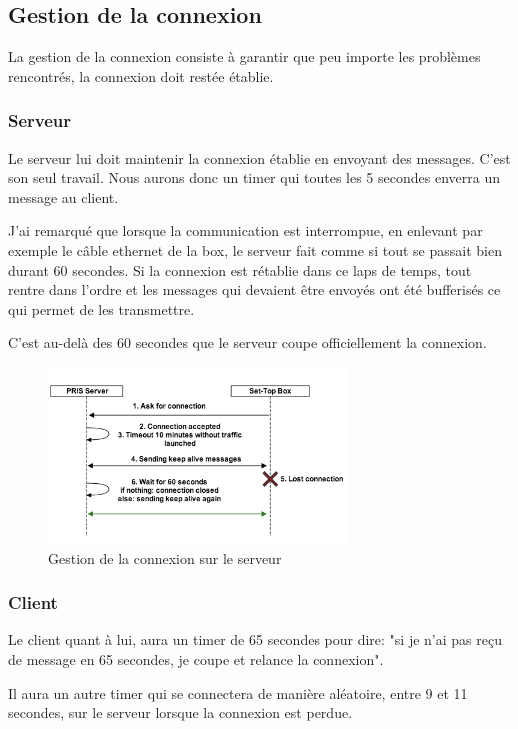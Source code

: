 \subsection{Gestion de la connexion}
La gestion de la connexion consiste à garantir que peu importe les problèmes rencontrés, la connexion doit restée établie.

\medskip

\subsubsection{Serveur}
Le serveur lui doit maintenir la connexion établie en envoyant des messages. C'est son seul travail. Nous aurons donc un timer qui toutes les 5 secondes enverra un message au client.

\medskip

J'ai remarqué que lorsque la communication est interrompue, en enlevant par exemple le câble ethernet de la box, le serveur fait comme si tout se passait bien durant 60 secondes. Si la connexion est rétablie dans ce laps de temps, tout rentre dans l'ordre et les messages qui devaient être envoyés ont été bufferisés ce qui permet de les transmettre.

C'est au-delà des 60 secondes que le serveur coupe officiellement la connexion.

\begin{figure}[H]
      \centering
      \includegraphics[width=300px]{00_media/server_ka}
      \caption{Gestion de la connexion sur le serveur}
      \label{gra:maqmenu}
\end{figure}

\subsubsection{Client}
Le client quant à lui, aura un timer de 65 secondes pour dire: "si je n'ai pas reçu de message en 65 secondes, je coupe et relance la connexion".

\medskip

Il aura un autre timer qui se connectera de manière aléatoire, entre 9 et 11 secondes, sur le serveur lorsque la connexion est perdue.
